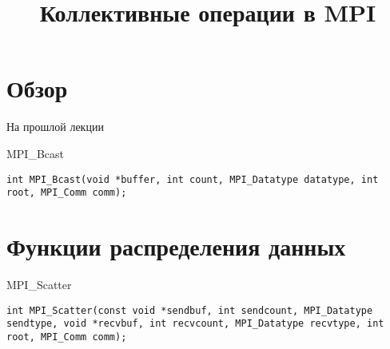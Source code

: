 

\title{Коллективные операции в MPI}



\begin{frame}
\titlepage
\end{frame}

\section{Обзор}

\begin{frame}
\tableofcontents
\end{frame} 

\begin{frame}{На прошлой лекции}
\end{frame}


\begin{frame}[fragile]{MPI_Bcast}

\begin{lstlisting}
int MPI_Bcast(void *buffer, int count, MPI_Datatype datatype, int root, MPI_Comm comm);
\end{lstlisting}

\end{frame}

\section{Функции распределения данных}

\begin{frame}[fragile]{MPI_Scatter}

\begin{lstlisting}
int MPI_Scatter(const void *sendbuf, int sendcount, MPI_Datatype sendtype, void *recvbuf, int recvcount, MPI_Datatype recvtype, int root, MPI_Comm comm);
\end{lstlisting}

\end{frame}


